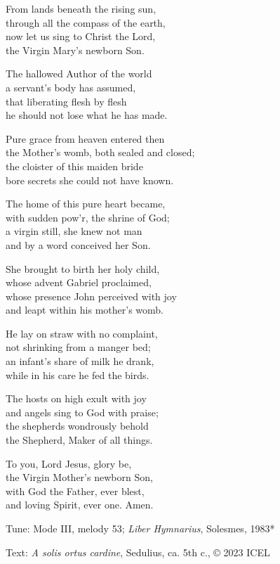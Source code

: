 \hymn

\settowidth{\versewidth}{the Mother’s womb, both sealed and closed;}

\begin{hymnverse}%
From lands beneath the rising sun,\\
through all the compass of the earth,\\
now let us sing to Christ the Lord,\\
the Virgin Mary’s newborn Son.

The hallowed Author of the world\\
a servant’s body has assumed,\\
that liberating flesh by flesh\\
he should not lose what he has made.

Pure grace from heaven entered then\\
the Mother’s womb, both sealed and closed;\\
the cloister of this maiden bride\\
bore secrets she could not have known.

The home of this pure heart became,\\
with sudden pow’r, the shrine of God;\\
a virgin still, she knew not man\\
and by a word conceived her Son.

She brought to birth her holy child,\\
whose advent Gabriel proclaimed,\\
whose presence John perceived with joy\\
and leapt within his mother’s womb.

He lay on straw with no complaint,\\
not shrinking from a manger bed;\\
an infant’s share of milk he drank,\\
while in his care he fed the birds.

The hosts on high exult with joy\\
and angels sing to God with praise;\\
the shepherds wondrously behold\\
the Shepherd, Maker of all things.

To you, Lord Jesus, glory be,\\
the Virgin Mother’s newborn Son,\\
with God the Father, ever blest,\\
and loving Spirit, ever one. Amen.
\end{hymnverse}

\begin{hymnsource}
Tune: Mode III, melody 53; \emph{Liber Hymnarius}, Solesmes, 1983*

Text: \emph{A solis ortus cardine}, Sedulius, ca. 5th c., © 2023 ICEL
\end{hymnsource}